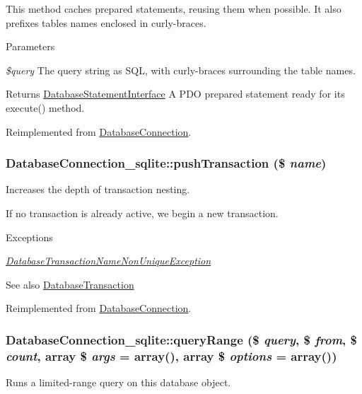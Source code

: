 This method caches prepared statements, reusing them when possible. It also prefixes tables names enclosed in curly-\/braces.


\begin{DoxyParams}{Parameters}
\item[{\em \$query}]The query string as SQL, with curly-\/braces surrounding the table names.\end{DoxyParams}
\begin{DoxyReturn}{Returns}
\hyperlink{interfaceDatabaseStatementInterface}{DatabaseStatementInterface} A PDO prepared statement ready for its execute() method. 
\end{DoxyReturn}


Reimplemented from \hyperlink{classDatabaseConnection_a3eb8c20adaffdd0f567bbe16d5226554}{DatabaseConnection}.\hypertarget{classDatabaseConnection__sqlite_a00c6285d1c008b5aa496b046700f15a3}{
\subsubsection[{pushTransaction}]{\setlength{\rightskip}{0pt plus 5cm}DatabaseConnection\_\-sqlite::pushTransaction (\$ {\em name})}}
\label{classDatabaseConnection__sqlite_a00c6285d1c008b5aa496b046700f15a3}
Increases the depth of transaction nesting.

If no transaction is already active, we begin a new transaction.


\begin{DoxyExceptions}{Exceptions}
\item[{\em \hyperlink{classDatabaseTransactionNameNonUniqueException}{DatabaseTransactionNameNonUniqueException}}]\end{DoxyExceptions}
\begin{DoxySeeAlso}{See also}
\hyperlink{classDatabaseTransaction}{DatabaseTransaction} 
\end{DoxySeeAlso}


Reimplemented from \hyperlink{classDatabaseConnection_a3aa9a595dd90a2b64d6b6c187f25828a}{DatabaseConnection}.\hypertarget{classDatabaseConnection__sqlite_a5c7aa6402ebb35a61c7753fa66ee6bd3}{
\subsubsection[{queryRange}]{\setlength{\rightskip}{0pt plus 5cm}DatabaseConnection\_\-sqlite::queryRange (\$ {\em query}, \/  \$ {\em from}, \/  \$ {\em count}, \/  array \$ {\em args} = {\ttfamily array()}, \/  array \$ {\em options} = {\ttfamily array()})}}
\label{classDatabaseConnection__sqlite_a5c7aa6402ebb35a61c7753fa66ee6bd3}
Runs a limited-\/range query on this database object.

